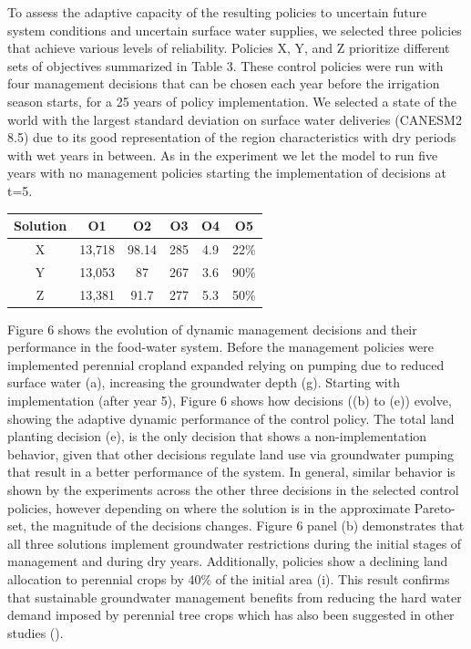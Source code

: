\documentclass[11pt,a4paper]{article}
\begin{document}
To assess the adaptive capacity of the resulting policies to uncertain future system conditions and uncertain surface water supplies, we selected three policies that achieve various levels of reliability. Policies X, Y, and Z prioritize different sets of objectives summarized in Table 3. These control policies  were run with four management decisions that can be  chosen each year before the irrigation season starts, for a 25 years of policy implementation. We selected a state of the world with the largest standard deviation on surface water deliveries (CANESM2 8.5) due to its good representation of the region characteristics with dry periods with wet years in between. As in the experiment we let the model to run five years with no management policies starting the implementation of decisions at t=5. 

\begin{center}
\begin{tabular}{ |c|c|c|c|c|c| }
 \hline
 Solution & O1 & O2 & O3 & O4 & O5 \\ 
 \hline
X &  13,718 & 98.14 &  285 & 4.9 & 22\% \\
Y &  13,053 & 87 & 267 & 3.6 & 90\% \\
Z &  13,381 & 91.7  & 277 & 5.3 & 50\% \\
\hline
\end{tabular}
\end{center}

Figure 6 shows the evolution of dynamic management decisions and their performance in the food-water system. Before the management policies were implemented perennial cropland expanded relying on pumping due to reduced surface water (a), increasing the groundwater depth (g). Starting with implementation (after year 5), Figure 6 shows how decisions ((b) to (e)) evolve, showing the adaptive dynamic performance of the control policy. The total land planting decision (e), is the only decision that shows a non-implementation behavior, given that other decisions regulate land use via groundwater pumping that result in a better performance of the system. In general, similar behavior is shown by the experiments across the other three decisions in the selected control policies, however depending on where the solution is in the approximate Pareto-set, the magnitude of the decisions changes. Figure 6 panel (b) demonstrates that all three solutions implement groundwater restrictions during the initial stages of management and during dry years. Additionally, policies show a declining land allocation to perennial crops by 40\% of the initial area (i). This result confirms that sustainable groundwater management benefits from reducing the hard water demand imposed by perennial tree crops which has also been suggested in other studies (\cite{qin_flexibility_2019,mall_water_2019}). 
\end{document}
